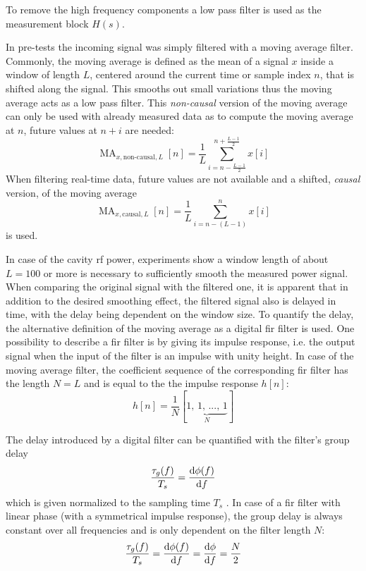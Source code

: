 To remove the high frequency components a low pass filter is used as the measurement block $H(s)$.

In pre-tests the incoming signal was simply filtered with a moving average filter.
Commonly, the moving average is defined as the mean of a signal $x$ inside a window of length $L$, centered around the current time or sample index $n$, that is shifted along the signal. This smooths out small variations thus the moving average acts as a low pass filter.
This \textit{non-causal} version of the moving average can only be used with already measured data as to compute the moving average at $n$, future values at $n+i$ are needed:
\begin{equation}
\operatorname{MA}_{x,\text{non-causal},L}[n] = \frac{1}{L} \sum_{i=n-\frac{L-1}{2}}^{n+\frac{L-1}{2}} x[i]
\end{equation}
When filtering real-time data, future values are not available and a shifted, \textit{causal} version, of the moving average
\begin{equation}\label{eq:causalMA}
\operatorname{MA}_{x,\text{causal},L}[n] = \frac{1}{L} \sum_{i=n-(L-1)}^{n} x[i]
\end{equation}
is used.

In case of the cavity \gls{rf} power, experiments show a window length of about $L=100$ or more is necessary to sufficiently smooth the measured power signal.
When comparing the original signal with the filtered one, it is apparent that in addition to the desired smoothing effect, the filtered signal also is delayed in time, with the delay being dependent on the window size.
To quantify the delay, the alternative definition of the moving average as a digital \gls{fir} filter is used.
One possibility to describe a \gls{fir} filter is by giving its impulse response, i.e. the output signal when the input of the filter is an impulse with unity height. In case of the moving average filter, the coefficient sequence of the corresponding \gls{fir} filter has the length $N=L$ and is equal to the the impulse response $h[n]$:
\begin{equation}
h[n] = \frac{1}{N} [\underbrace{1,\,1,\,...,\,1}_N]
\end{equation}

The delay introduced by a digital filter can be quantified with the filter's group delay
\begin{equation}
\frac{\tau_g(f)}{T_s} = \frac{\text{d}{\phi(f)}}{\text{d}{f}}
\end{equation}
which is given normalized to the sampling time $T_s$ \cite[p.~70]{Kammeyer2002}. In case of a \gls{fir} filter with linear phase (with a symmetrical impulse response), the group delay is always constant over all frequencies and is only dependent on the filter length $N$\cite[p.~165]{Kammeyer2002}:
\begin{equation}\label{eq:groupD}
\frac{\tau_g(f)}{T_s} = \frac{\text{d}{\phi(f)}}{\text{d}{f}} = \frac{\text{d}{\phi}}{\text{d}{f}} = \frac{N}{2}
\end{equation}

